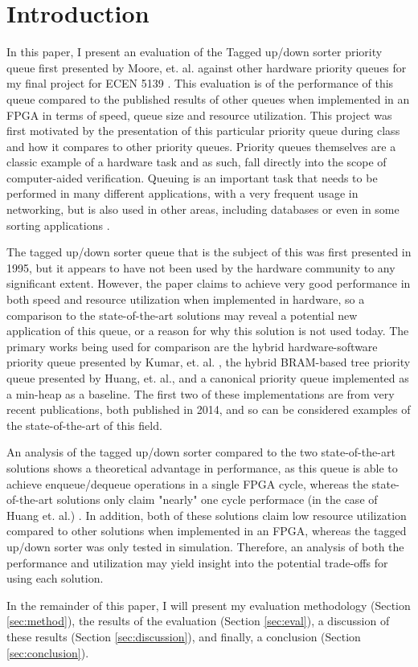 \section{Introduction}
\label{sec:intro}

In this paper, I present an evaluation of the Tagged up/down sorter priority queue first presented by Moore, et. al. against other hardware priority queues for my final project for ECEN 5139 \cite{Moore95taggedup/down}. This evaluation is of the performance of this queue compared to the published results of other queues when implemented in an FPGA in terms of speed, queue size and resource utilization. This project was first motivated by the presentation of this particular priority queue during class and how it compares to other priority queues. Priority queues themselves are a classic example of a hardware task and as such, fall directly into the scope of computer-aided verification. Queuing is an important task that needs to be performed in many different applications, with a very frequent usage in networking, but is also used in other areas, including databases or even in some sorting applications \cite{huang2014scalable}.

The tagged up/down sorter queue that is the subject of this was first presented in 1995, but it appears to have not been used by the hardware community to any significant extent. However, the paper claims to achieve very good performance in both speed and resource utilization when implemented in hardware, so a comparison to the state-of-the-art solutions may reveal a potential new application of this queue, or a reason for why this solution is not used today. The primary works being used for comparison are the hybrid hardware-software priority queue presented by Kumar, et. al. \cite{KumVya13B}, the hybrid BRAM-based tree priority queue presented by Huang, et. al., and a canonical priority queue implemented as a min-heap as a baseline. The first two of these implementations are from very recent publications, both published in 2014, and so can be considered examples of the state-of-the-art of this field.

An analysis of the tagged up/down sorter compared to the two state-of-the-art solutions shows a theoretical advantage in performance, as this queue is able to achieve enqueue/dequeue operations in a single FPGA cycle, whereas the state-of-the-art solutions only claim "nearly" one cycle performace (in the case of Huang et. al.) \cite{huang2014scalable}. In addition, both of these solutions  claim low resource utilization compared to other solutions when implemented in an FPGA, whereas the tagged up/down sorter was only tested in simulation. Therefore, an analysis of both the performance and utilization may yield insight into the potential trade-offs for using each solution.

In the remainder of this paper, I will present my evaluation methodology (Section \ref{sec:method}), the results of the evaluation (Section \ref{sec:eval}), a discussion of these results (Section \ref{sec:discussion}), and finally, a conclusion (Section \ref{sec:conclusion}).